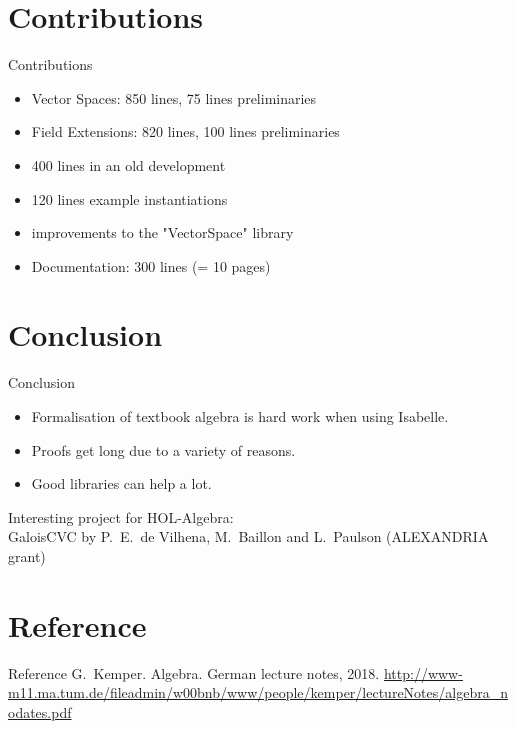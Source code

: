 \documentclass[%
	sans,
	12pt,
]{beamer}
\begin{document}
\section{Contributions}
\begin{frame}{Contributions}
\begin{itemize}
	\item Vector Spaces: 850 lines, 75 lines preliminaries\pause
	\item Field Extensions: 820 lines, 100 lines preliminaries\pause%
	\item 400 lines in an old development\pause %
	\item 120 lines example instantiations\pause %
	\item improvements to the "VectorSpace" library\pause
	\item Documentation: 300 lines (= 10 pages)
\end{itemize}
\end{frame}

\section{Conclusion}
\begin{frame}{Conclusion}
\begin{itemize}
\item Formalisation of textbook algebra is hard work when using Isabelle.\pause%
\item Proofs get long due to a variety of reasons.\pause
\item Good libraries can help a lot.\pause\\[6mm] %
\end{itemize}
Interesting project for HOL-Algebra:\\[2mm]
GaloisCVC by P.\ E.\ de Vilhena, M.\ Baillon and L.\ Paulson (ALEXANDRIA grant)
\end{frame}

\section{Reference}
\begin{frame}{Reference}
	G.\ Kemper. Algebra. German lecture notes, 2018. \url{http://www-m11.ma.tum.de/fileadmin/w00bnb/www/people/kemper/lectureNotes/algebra\_nodates.pdf} 
\end{frame}
\end{document}
